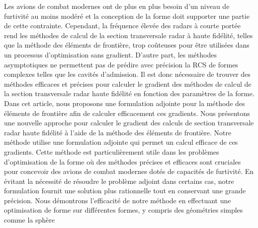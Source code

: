 \begin{resume}
    Les avions de combat modernes ont de plus en plus besoin d'un niveau de furtivité au moins modéré et la conception de la forme doit supporter une partie de cette contrainte. Cependant, la fréquence élevée des radars à courte portée rend les méthodes de calcul de la section transversale radar à haute fidélité, telles que la méthode des éléments de frontière, trop coûteuses pour être utilisées dans un processus d'optimisation sans gradient. D'autre part, les méthodes asymptotiques ne permettent pas de prédire avec précision la RCS de formes complexes telles que les cavités d'admission. Il est donc nécessaire de trouver des méthodes efficaces et précises pour calculer le gradient des méthodes de calcul de la section transversale radar haute fidélité en fonction des paramètres de la forme.
    Dans cet article, nous proposons une formulation adjointe pour la méthode des éléments de frontière afin de calculer efficacement ces gradients. Nous présentons une nouvelle approche pour calculer le gradient des calculs de section transversale radar haute fidélité à l'aide de la méthode des éléments de frontière. Notre méthode utilise une formulation adjointe qui permet un calcul efficace de ces gradients. Cette méthode est particulièrement utile dans les problèmes d'optimisation de la forme où des méthodes précises et efficaces sont cruciales pour concevoir des avions de combat modernes dotés de capacités de furtivité. En évitant la nécessité de résoudre le problème adjoint dans certains cas, notre formulation fournit une solution plus rationnelle tout en conservant une grande précision. Nous démontrons l'efficacité de notre méthode en effectuant une optimisation de forme sur différentes formes, y compris des géométries simples comme la sphère
\end{resume}
